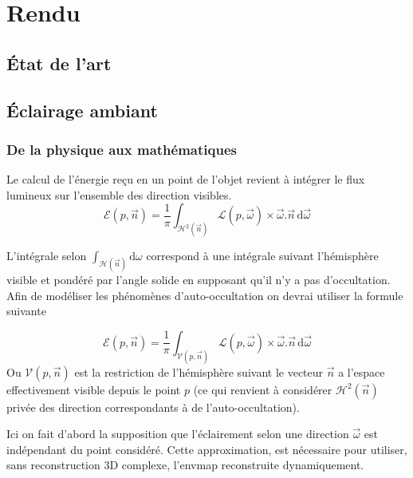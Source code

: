 \documentclass[10pt,a4paper,twoside, twocolumn]{report}
\begin{document}
\chapter{Rendu}


\section{État de l'art}


\section{Éclairage ambiant}\label{section:ambiant}

\subsection{De la physique aux mathématiques}
Le calcul de l'énergie reçu en un point de l'objet revient à intégrer le flux lumineux sur l'ensemble des direction visibles.
\begin{equation}
	\mathcal E(p, \vec n)=\frac{1}{\pi}\int_{\mathcal{H}^2(\vec{n})}\mathcal L(p,\vec\omega)\times\vec\omega.\vec n\, \mathrm d\vec\omega
\end{equation}

L'intégrale selon $\int_{\mathcal{H}(\vec n)}\mathrm d\omega$ correspond à une intégrale suivant l'hémisphère visible et pondéré par l'angle solide en supposant qu'il n'y a pas d'occultation. Afin de modéliser les phénomènes d'auto-occultation on devrai utiliser la formule suivante

\begin{equation}
	\mathcal E(p, \vec n)=\frac{1}{\pi}\int_{\mathcal V(p, \vec n )}\mathcal L(p, \vec\omega)\times\vec\omega.\vec n\, \mathrm d\vec\omega
\end{equation}
Ou $\mathcal V(p, \vec n)$ est la restriction de l'hémisphère suivant le vecteur $\vec n$ a l'espace effectivement visible depuis le point $p$ (ce qui renvient à considérer $\mathcal H^2(\vec n)$ privée des direction correspondants à de l'auto-occultation).

Ici on fait d'abord la supposition que l'éclairement selon une direction $\vec{\omega}$ est indépendant du point considéré. Cette approximation, est nécessaire pour utiliser, sans reconstruction 3D complexe, l'envmap reconstruite dynamiquement.
\end{document}
